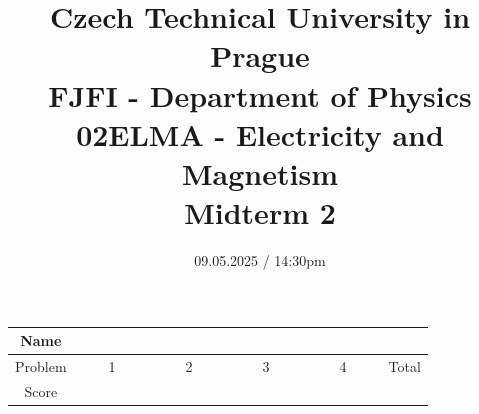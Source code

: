 \documentclass[a4paper,12pt]{article}
\title{{\large Czech Technical University in Prague} \\
    {\Large FJFI - Department of Physics} \\ 
                  02ELMA - Electricity and Magnetism \\ 
          {\Large \textbf{Midterm 2}}\vspace{-1cm}}
\date{09.05.2025 / 14:30pm}
\author{}
\begin{document}
\maketitle
\vspace{-1.5em}

\begin{center}
    \renewcommand{\arraystretch}{2}
    \begin{tabular}{ |c|c|c|c|c|c| } 
        \hline
        Name& \multicolumn{5}{c|}{\phantom{~~~~~~~~~~~~~~~~~~~~~~~~~~~~~~~~~~~~~~~~~~~~~~~~~~~~~~~~~~~~~~~~~~~~~~~~~~~~~~~~~}}\\
        \hline
        Problem & ~~~~1~~~~ & ~~~~2~~~~ & ~~~~3~~~~ & ~~~~4~~~~ & Total \\ 
        \hline
        Score & &  & & & \\
        \hline
    \end{tabular}
\end{center}

\vspace*{1cm}







\end{document}
